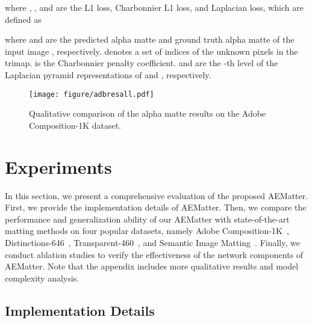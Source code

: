 \documentclass[10pt,twocolumn,letterpaper]{article}
\begin{document}
where  ,  , and   are the L1  loss,  Charbonnier L1 loss,  and Laplacian loss, which are defined as

where  and  are the predicted alpha matte and ground truth alpha matte of the input image , respectively. 
 denotes  a set of indices of the unknown pixels in the trimap.
 is the Charbonnier penalty coefficient. 
 and  are the -th level of the Laplacian pyramid representations of  and , respectively.


\begin{figure*}[th]
\texttt{[image: figure/adbresall.pdf]}
  \vspace{-0.5cm}
	\caption{Qualitative comparison of the alpha matte results on the Adobe Composition-1K dataset.  }
	\label{fig:aim}
 \vspace{-0.2cm}
\end{figure*}


\section{Experiments}
In this section, we present a comprehensive evaluation of the proposed AEMatter. 
First, we provide the implementation details of AEMatter.
Then, we compare the performance and  generalization ability of our AEMatter with state-of-the-art matting methods on four popular datasets, namely Adobe Composition-1K~\cite{xu2017deep}, Distinctions-646~\cite{2020Attention},  Transparent-460~\cite{cai2022TransMatting}, and Semantic Image Matting~\cite{sun2021sim}.
Finally, we conduct ablation studies to verify the effectiveness of the network components of AEMatter.
Note that the appendix includes more qualitative results and model complexity analysis.

\subsection{Implementation Details}
\end{document}
